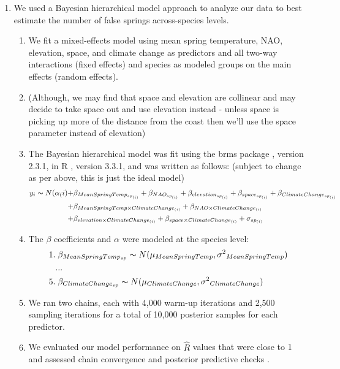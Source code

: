 \documentclass{article}\usepackage[]{graphicx}\usepackage[]{color}
\begin{document}
\begin{enumerate}
\item We used a Bayesian hierarchical model approach to analyze our data to best estimate the number of false springs across-species levels. 
\begin{enumerate}
\item We fit a mixed-effects model using mean spring temperature, NAO, elevation, space, and climate change as predictors and all two-way interactions (fixed effects) and species as modeled groups on the main effects (random effects).
\item (Although, we may find that space and elevation are collinear and may decide to take space out and use elevation instead - unless space is picking up more of the distance from the coast then we'll use the space parameter instead of elevation)
\item The Bayesian hierarchical model was fit using the brms package \citep{brms}, version 2.3.1,  in R \citep{R}, version 3.3.1, and was written as follows: (subject to change as per above, this is just the ideal model)
\begin{align*} \label{eq:1} %
y_i \thicksim N(\alpha_(i) +& \beta_{MeanSpringTemp_{sp_{(i)}}} + \beta_{NAO_{sp_{(i)}}} + \beta_{elevation_{sp_{(i)}}}
+ \beta_{space_{sp_{(i)}}} + \beta_{ClimateChange_{sp_{(i)}}} \\
+& \beta_{MeanSpringTemp \times Climate Change_{(i)}} + \beta_{NAO \times Climate Change_{(i)}} \\
+& \beta_{elevation \times Climate Change_{(i)}} + \beta_{space \times Climate Change_{(i)}} + \sigma_{sp_{(i)}} 
\end{align*}
\item The $\beta$ coefficients and $\alpha$ were modeled at the species level:
\begin{align*}
1.& \; \beta_{MeanSpringTemp_{sp}} \thicksim N(\mu_{MeanSpringTemp}, \sigma{^2}_{MeanSpringTemp}) \\
   &... \\
5.& \; \beta_{ClimateChange_{sp}} \thicksim N(\mu_{ClimateChange}, \sigma{^2}_{ClimateChange})
\end{align*}
\item We ran two chains, each with 4,000 warm-up iterations and 2,500 sampling iterations for a total of 10,000 posterior samples for each predictor. 
\item We evaluated our model performance on $\hat{R}$ values that were close to 1 and assessed chain convergence and posterior predictive checks \citep{Gelman2006}.
\end{enumerate}
\end{enumerate}
\end{document}
